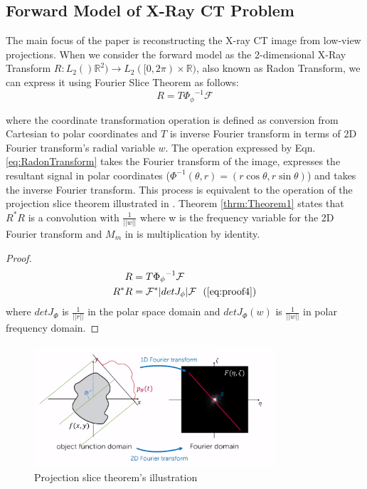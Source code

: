 \documentclass[journal, onecolumn, 11pt]{IEEEtran}
\begin{document}
\subsection{Forward Model of X-Ray CT Problem}
The main focus of the paper is reconstructing the X-ray CT image from low-view projections. When we consider the forward model as the 2-dimensional X-Ray Transform $R: L_2()\mathbb{R}^2) \rightarrow L_2([0,2\pi) \times \mathbb{R})$, also known as Radon Transform, we can express it using Fourier Slice Theorem as follows: 
\begin{equation}
    R = T {\Phi_\phi}^{-1} \mathcal{F}
    \label{eq:RadonTransform}
\end{equation}


where the coordinate transformation operation is defined as conversion from Cartesian to polar coordinates and $T$ is inverse Fourier transform in terms of 2D Fourier transform's radial variable $w$. The operation expressed by Eqn. \ref{eq:RadonTransform} takes the Fourier transform of the image, expresses the resultant signal in polar coordinates ($\Phi^{-1}(\theta, r) = (r\cos\theta,r\sin\theta)$) and takes the inverse Fourier transform. This process is equivalent to the operation of the projection slice theorem illustrated in . Theorem \ref{thrm:Theorem1} states that $R^\ast R$ is a convolution with $\frac{1}{||w||}$ where w is the frequency variable for the 2D Fourier transform and $M_m$ in  is multiplication by identity. 

\begin{proof}
    \begin{align}
        R &= T {\Phi_\phi}^{-1} \mathcal{F} \\
        R^\ast R &=  \mathcal{F}^\ast |det J_\phi| \mathcal{F} \ \ (\ref{eq:proof4}) \\
    \end{align}
    where $det J_\Phi$ is $\frac{1}{||r||}$ in the polar space domain and $det J_\Phi(w)$ is $\frac{1}{||w||}$ in polar frequency domain.
\end{proof}

\begin{figure}[h]
    \centering
    \includegraphics[width=0.8\textwidth]{images/slicethm.png}
    \caption{Projection slice theorem's illustration \cite{kooi_2021}}\label{fig:radonimg}
    \end{figure}
\end{document}
